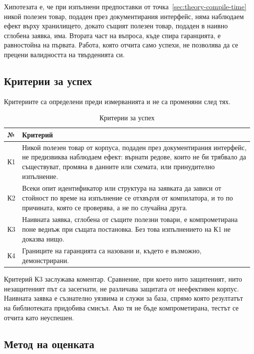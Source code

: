 Хипотезата е, че при изпълнени предпоставки от
точка~\ref{sec:theory-compile-time} никой полезен товар, подаден през
документирания интерфейс, няма наблюдаем ефект върху хранилището, докато същият
полезен товар, подаден в наивно сглобена заявка, има. Втората част на въпроса,
къде спира гаранцията, е равностойна на първата. Работа, която отчита само
успехи, не позволява да се прецени валидността на твърденията си.

\subsection{Критерии за успех}
\label{sec:tm-criteria}

Критериите са определени преди измерванията и не са променяни след тях.

\begin{table}[H]
\centering
\caption{Критерии за успех}
\label{tab:tm-criteria}
\begin{tabularx}{\textwidth}{L{1.0cm}Y}
\toprule
\textbf{№} & \textbf{Критерий} \\
\midrule
К1 & Никой полезен товар от корпуса, подаден през документирания интерфейс, не
     предизвиква наблюдаем ефект: върнати редове, които не би трябвало да
     съществуват, промяна в данните или схемата, или принудително изпълнение. \\
К2 & Всеки опит идентификатор или структура на заявката да зависи от стойност по
     време на изпълнение се отхвърля от компилатора, и то по причината, която се
     проверява, а не по случайна друга. \\
К3 & Наивната заявка, сглобена от същите полезни товари, е компрометирана поне
     веднъж при същата постановка. Без това изпълнението на К1 не доказва нищо. \\
К4 & Границите на гаранцията са назовани и, където е възможно, демонстрирани. \\
\bottomrule
\end{tabularx}
\end{table}

Критерий К3 заслужава коментар. Сравнение, при което нито защитеният, нито
незащитеният път са засегнати, не различава защитата от неефективен корпус.
Наивната заявка е съзнателно уязвима и служи за база, спрямо която резултатът на
библиотеката придобива смисъл. Ако тя не бъде компрометирана, тестът се отчита
като неуспешен.

\subsection{Метод на оценката}
\label{sec:tm-method}

